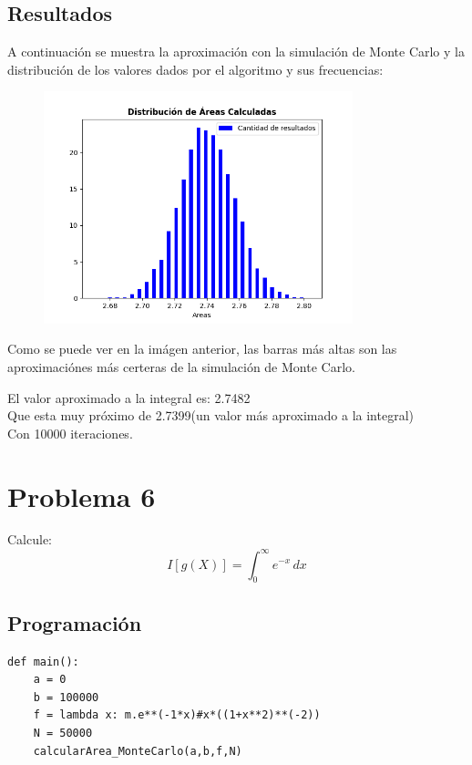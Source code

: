 \documentclass[a4paper,12pt]{article}
\begin{document}
    \subsection{Resultados}
    A continuación se muestra la aproximación con la simulación de Monte Carlo y 
    la distribución de los valores dados por el algoritmo y sus frecuencias:
    \begin{figure}[h]
        \centering
        \includegraphics[width=0.8\textwidth]{ejer5.png}
    \end{figure}
    
    Como se puede ver en la imágen anterior, las barras más altas son 
    las aproximaciónes más certeras de la simulación de Monte Carlo.
    
    El valor aproximado a la integral es: 2.7482\\
    Que esta muy próximo de 2.7399(un valor más aproximado a la integral)\\
    Con 10000 iteraciones.

    \section{Problema 6}
    Calcule:
    \begin{equation}
        I[g(X)] = \int_{0}^{\infty} e^{-x} \,dx
    \end{equation}

    \subsection{Programación}
\begin{lstlisting}
def main():
    a = 0
    b = 100000
    f = lambda x: m.e**(-1*x)#x*((1+x**2)**(-2))
    N = 50000
    calcularArea_MonteCarlo(a,b,f,N)
\end{lstlisting}
\end{document}
